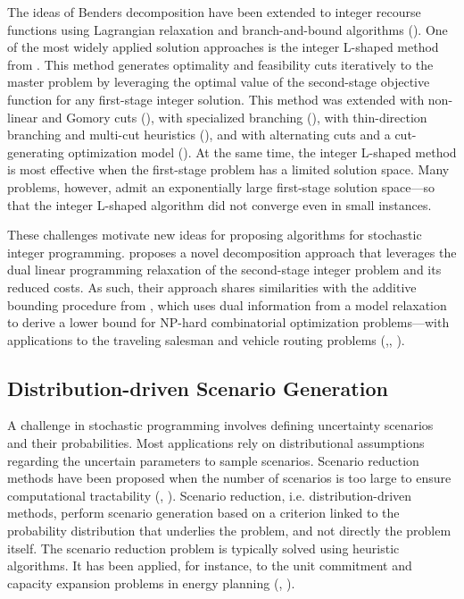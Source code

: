 \documentclass{article}
\theoremstyle{plain}
\theoremstyle{definition}
\begin{document}
The ideas of Benders decomposition have been extended to integer recourse functions using Lagrangian relaxation and branch-and-bound algorithms (\cite{Caroe and Schultz 1997}). One of the most widely applied solution approaches is the integer L-shaped method from \cite{Laporte and Louveaux (1993)}. This method generates optimality and feasibility cuts iteratively to the master problem by leveraging the optimal value of the second-stage objective function for any first-stage integer solution. This method was extended with non-linear and Gomory cuts (\cite{Caroe and Schultz 1999}), with specialized branching (\cite{Ahmed et al. 2004}), with thin-direction branching and multi-cut heuristics (\cite{Kim and Mehrotra 2015}), and with alternating cuts and a cut-generating optimization model (\cite{Angulo et al. 2016}). At the same time, the integer L-shaped method is most effective when the first-stage problem has a limited solution space. Many problems, however, admit an exponentially large first-stage solution space—so that the integer L-shaped algorithm did not converge even in small instances.

These challenges motivate new ideas for proposing algorithms for stochastic integer programming. \cite{Wang and  Jacquillat 2020} proposes a novel decomposition approach that leverages the dual linear programming relaxation of the second-stage integer problem and its reduced costs. As such, their approach shares similarities with the additive bounding procedure from \cite{Fischetti and Toth 1989}, which uses dual information from a model relaxation to derive a lower bound for NP-hard combinatorial optimization problems—with applications to the traveling salesman and vehicle routing problems (\cite{Fischetti and Toth 1992},\cite{ Baldacci et al. 2008}, \cite{Baldacci and Mingozzi 2009}).

\subsection{Distribution-driven Scenario Generation}

A challenge in stochastic programming involves defining uncertainty scenarios and their probabilities. Most applications rely on distributional assumptions regarding the uncertain parameters to sample scenarios. Scenario reduction methods have been proposed when the number of scenarios is too large to ensure computational tractability (\cite{Dupacova et al. 2003}, \cite{Romisch 2009}). Scenario reduction, i.e. distribution-driven methods, perform scenario generation based on a criterion linked to the probability distribution that underlies the problem, and not directly the problem itself. The scenario reduction problem is typically solved using heuristic algorithms. It has been applied, for instance, to the unit commitment and capacity expansion problems in energy planning (\cite{Carrion et al. 2007}, \cite{Morales et al. 2009}). 
\end{document}
